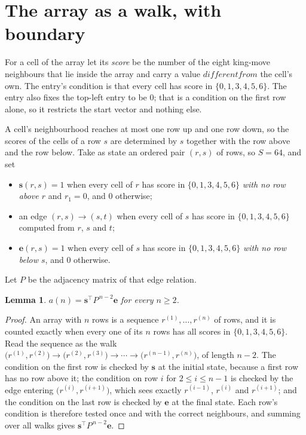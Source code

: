 \documentclass[11pt,a4paper]{article}
\theoremstyle{plain}
\newtheorem{lemma}[theorem]{Lemma}
\theoremstyle{definition}
\begin{document}
\section{The array as a walk, with boundary}

For a cell of the array let its \emph{score} be the number of the eight king-move neighbours that lie inside
the array and carry a value $different from$ the cell's own. The entry's condition is that every cell
has score in $\{0,1,3,4,5,6\}$. The entry also fixes the top-left entry to be $0$; that is a condition on the first row alone, so it restricts the start vector and nothing else.

A cell's neighbourhood reaches at most one row up and one row down, so the scores of the
cells of a row $s$ are determined by $s$ together with the row above and the row below.
Take as state an ordered pair $(r,s)$ of rows, so $S=64$, and set
\begin{itemize}
\item $\mathbf{s}(r,s)=1$ when every cell of $r$ has score in $\{0,1,3,4,5,6\}$ \emph{with no row
above $r$} and $r_1=0$, and $0$ otherwise;
\item an edge $(r,s)\to(s,t)$ when every cell of $s$ has score in $\{0,1,3,4,5,6\}$ computed from
$r$, $s$ and $t$;
\item $\mathbf{e}(r,s)=1$ when every cell of $s$ has score in $\{0,1,3,4,5,6\}$ \emph{with no row
below $s$}, and $0$ otherwise.
\end{itemize}
Let $P$ be the adjacency matrix of that edge relation.

\begin{lemma}\label{lem:walk}
$a(n)=\mathbf{s}^{\!\top}P^{\,n-2}\mathbf{e}$ for every $n\ge2$.
\end{lemma}

\begin{proof}
An array with $n$ rows is a sequence $r^{(1)},\dots,r^{(n)}$ of rows, and it is counted
exactly when every one of its $n$ rows has all scores in $\{0,1,3,4,5,6\}$. Read the sequence as the
walk $\bigl(r^{(1)},r^{(2)}\bigr)\to\bigl(r^{(2)},r^{(3)}\bigr)\to\cdots\to
\bigl(r^{(n-1)},r^{(n)}\bigr)$, of length $n-2$. The condition on the first row is
checked by $\mathbf{s}$ at the initial state, because a first row has no row above it; the
condition on row $i$ for $2\le i\le n-1$ is checked by the edge entering
$\bigl(r^{(i)},r^{(i+1)}\bigr)$, which sees exactly $r^{(i-1)}$, $r^{(i)}$ and
$r^{(i+1)}$; and the condition on the last row is checked by $\mathbf{e}$ at the final
state. Each row's condition is therefore tested once and with the correct neighbours, and
summing over all walks gives $\mathbf{s}^{\!\top}P^{\,n-2}\mathbf{e}$.
\end{proof}
\end{document}
